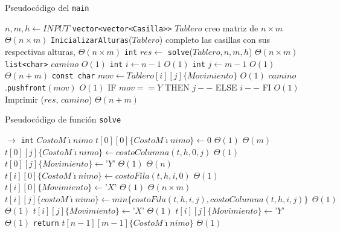 \begin{algorithm}[H]
  \begin{algorithmic}[1]
  \caption{Pseudocódigo del \texttt{main}}
  \label{algo:3-1}
 	\State $n, m, h \gets INPUT$
 	\State \texttt{vector<vector<Casilla>\null>} $Tablero$ 
 	\Comment creo matriz de $n \times m$
 	\Comment $\Theta(n\times m)$
 	\State \texttt{InicializarAlturas}($Tablero$) 
 	\Comment completo las casillas con sus respectivas alturas, $\Theta(n\times m)$
	\State \texttt{int} $res \gets$ \texttt{solve}($Tablero,n,m,h$)
	\Comment $\Theta(n\times m)$
	\State \texttt{list<char>} $camino$
	\Comment $O(1)$
	\State \texttt{int} $i \gets n-1$
	\Comment $O(1)$
	\State \texttt{int} $j \gets m-1$
	\Comment $O(1)$
	\Comment $\Theta(n+m)$
		\State \texttt{const char} $mov \gets Tablero[i][j]\{Movimiento\}$
		\Comment $O(1)$
		\State $camino$.\texttt{pushfront}$(mov)$
		\Comment $O(1)$
		\State IF $mov == Y$ THEN $j--$ ELSE $i--$ FI
		\Comment $O(1)$
	\EndWhile
	\State Imprimir ($res$, $camino$)
	\Comment $\Theta(n+m)$
    \EndProcedure
  \end{algorithmic}
\end{algorithm}

  
\begin{algorithm}[H]
  \begin{algorithmic}[1]
  \caption{Pseudocódigo de función \texttt{solve}}
  \label{algo:3-2}
     $\rightarrow$ \texttt{int} $CostoM\acute{\imath}nimo$
		\State $t[0][0]\{CostoM\acute{\imath}nimo\} \gets 0$
		\Comment $\Theta(1)$
		\Comment $\Theta(m)$
			\State $t[0][j]\{CostoM\acute{\imath}nimo\} \gets costoColumna(t,h,0,j)$
			\Comment $\Theta(1)$
			\State $t[0][j]\{Movimiento\} \gets $'$Y$'$ $
			\Comment $\Theta(1)$
		\EndFor
		\Comment $\Theta(n)$
			\State $t[i][0]\{CostoM\acute{\imath}nimo\} \gets costoFila(t,h,i,0)$
			\Comment $\Theta(1)$
			\State $t[i][0]\{Movimiento\} \gets $'$X$'$ $
			\Comment $\Theta(1)$
		\EndFor
		\Comment $\Theta(n \times m)$
				\State $t[i][j]\{costoM\acute{\imath}nimo\} \gets min\{costoFila(t,h,i,j), costoColumna(t,h,i,j)\} \ \  \Theta(1)$
				\Comment $\Theta(1)$
					\State $t[i][j]\{Movimiento\} \gets $'$X$'$ $ 
					\Comment $\Theta(1)$
				\Else
					\State $t[i][j]\{Movimiento\} \gets $'$Y$'$ $
					\Comment $\Theta(1)$
				\EndIf
			\EndFor
		\EndFor
	\State \texttt{return} $t[n-1][m-1]\{CostoM\acute{\imath}nimo\}$
	\Comment $\Theta(1)$
	\EndProcedure
	\end{algorithmic}
\end{algorithm}

